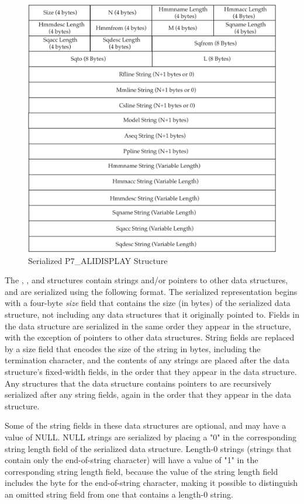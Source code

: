 \documentclass[notoc,justified]{tufte-book}    %
\begin{document}
\begin{figure}
\includegraphics[width=\textwidth]{inclusions/alidisplay-serialize.pdf}
\caption{Serialized {P7\_ALIDISPLAY} Structure}
\label{fig:alidisplay-serialize}
\end{figure}

The , , and  structures contain strings and/or pointers to other data structures, and are serialized using the following format.  The serialized representation begins with a four-byte {\em size} field that contains the size (in bytes) of the serialized data structure, not including any data structures that it originally pointed to.  Fields in the data structure are serialized in the same order they appear in the structure, with the exception of pointers to other data structures.  String fields are replaced by a size field that encodes the size of the string in bytes, including the termination character, and the contents of any strings are placed after the data structure's fixed-width fields, in the order that they appear in the data structure.  Any structures that the data structure contains pointers to are recursively serialized after any string fields, again in the order that they appear in the data structure.

Some of the string fields in these data structures are optional, and may have a value of NULL.  NULL strings are serialized by placing a "0" in the corresponding string length field of the serialized data structure.  Length-0 strings (strings that contain only the end-of-string character) will have a value of "1" in the corresponding string length field, because the value of the string length field includes the byte for the end-of-string character, making it possible to distinguish an omitted string field from one that contains a length-0 string.
\end{document}
